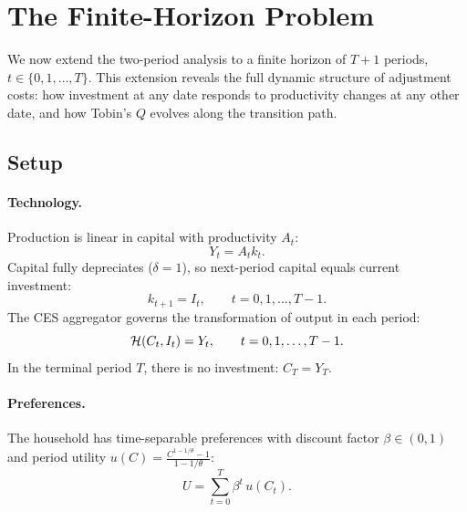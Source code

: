 \section{The Finite-Horizon Problem}
\label{sec:ac-T-period}

We now extend the two-period analysis to a finite horizon of $T+1$ periods, $t \in \{0, 1, \ldots, T\}$. This extension reveals the full dynamic structure of adjustment costs: how investment at any date responds to productivity changes at any other date, and how Tobin's $Q$ evolves along the transition path.

\subsection{Setup}
\label{subsec:ac-T-setup}

\paragraph{Technology.}
Production is linear in capital with productivity $A_t$:
\begin{equation}
Y_t = A_t k_t.
\label{eq:ac-T-production}
\end{equation}
Capital fully depreciates ($\delta = 1$), so next-period capital equals current investment:
\begin{equation}
k_{t+1} = I_t, \qquad t = 0, 1, \ldots, T-1.
\label{eq:ac-T-capital}
\end{equation}
The CES aggregator governs the transformation of output in each period:
\begin{equation}
\mathcal{H}(C_t, I_t) = Y_t, \qquad t = 0, 1, \ldots, T-1.
\label{eq:ac-T-resource}
\end{equation}
In the terminal period $T$, there is no investment: $C_T = Y_T$.

\paragraph{Preferences.}
The household has time-separable preferences with discount factor $\beta \in (0,1)$ and period utility $u(C) = \frac{C^{1-1/\theta} - 1}{1 - 1/\theta}$:
\begin{equation}
U = \sum_{t=0}^{T} \beta^t \, u(C_t).
\label{eq:ac-T-utility}
\end{equation}

